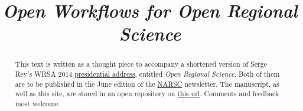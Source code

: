 
\title{\textit{Open Workflows for Open Regional Science}}
\maketitle
\renewcommand{\abstractname}{\href{http://darribas.org}{[Dani Arribas-Bel]}}
\begin{abstract}
          This text is written as a thought piece to accompany a shortened version
          of Serge Rey's WRSA 2014 \href{https://github.com/sjsrey/ors}{
          presidential address}, entitled \textit{Open Regional Science}. Both of them are to be
          published in the June edition of the \href{http://narsc.org"}{NARSC} newsletter.
          The manuscript, as well as this site, are stored in an open
          repository on \href{https://github.com/darribas/ow4ors/}{this
          url}. Comments and feedback most welcome.

\end{abstract}

